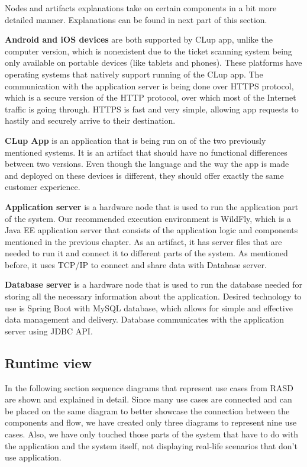   

Nodes and artifacts explanations take on certain components in a bit more detailed manner. Explanations can be found in next part of this section.

\newpage

\textbf{Android and iOS devices} are both supported by CLup app, unlike the computer version, which is nonexistent due to the ticket scanning system being only available on portable devices (like tablets and phones). These platforms have operating systems that natively support running of the CLup app. The communication with the application server is being done over HTTPS protocol, which is a secure version of the HTTP protocol, over which most of the Internet traffic is going through. HTTPS is fast and very simple, allowing app requests to hastily and securely arrive to their destination.  \newline

\textbf{CLup App} is an application that is being run on of the two previously mentioned systems. It is an artifact that should have no functional differences between two versions. Even though the language and the way the app is made and deployed on these devices is different, they should offer exactly the same customer experience. \newline

\textbf{Application server} is a hardware node that is used to run the application part of the system. Our recommended execution environment is WildFly, which is a Java EE application server that consists of the application logic and components mentioned in the previous chapter. As an artifact, it has server files that are needed to run it and connect it to different parts of the system. As mentioned before, it uses TCP/IP to connect and share data with Database server.  \newline


\textbf{Database server} is a hardware node that is used to run the database needed for storing all the necessary information about the application. Desired technology to use is Spring Boot with MySQL database, which allows for simple and effective data management and delivery. Database communicates with the application server using JDBC API.    \newline

\newpage

\subsection{Runtime view}
\hspace{\parindent} In the following section sequence diagrams that represent use cases from RASD are shown and explained in detail. Since many use cases are connected and can be placed on the same diagram to better showcase the connection between the components and flow, we have created only three diagrams to represent nine use cases. Also, we have only touched those parts of the system that have to do with the application and the system itself, not displaying real-life scenarios that don't use application.  

